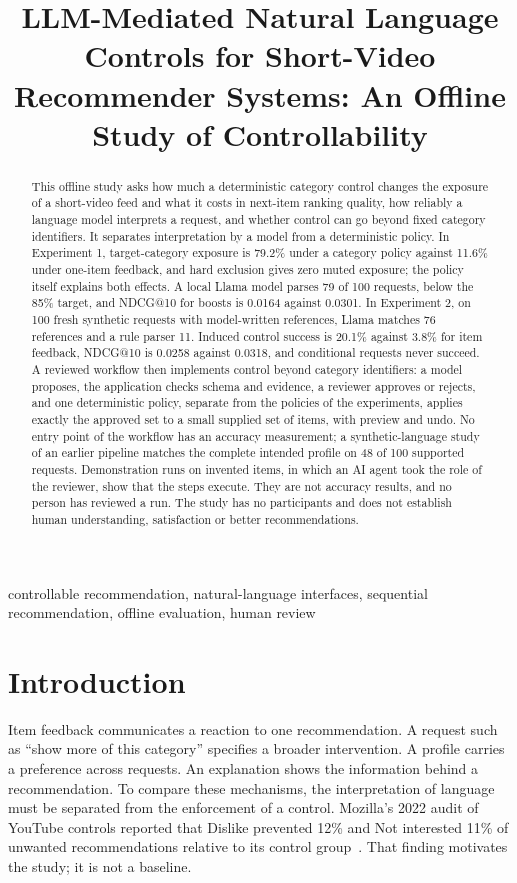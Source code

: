 \documentclass[conference]{IEEEtran}
\title{LLM-Mediated Natural Language Controls for Short-Video Recommender Systems: An Offline Study of Controllability}
\author{\IEEEauthorblockN{Vibhor Malik}\IEEEauthorblockA{M.Sc. in Applied Computing, British Columbia Institute of Technology\\COMP 9500 Research Project. Supervisor: Borna Noureddin. \PaperDate}}
\begin{document}
\maketitle
\thispagestyle{plain}\pagestyle{plain}
\begin{abstract}
This offline study asks how much a deterministic category control changes the exposure of a short-video feed and what it costs in next-item ranking quality, how reliably a language model interprets a request, and whether control can go beyond fixed category identifiers. It separates interpretation by a model from a deterministic policy. In Experiment 1, target-category exposure is 79.2\% under a category policy against 11.6\% under one-item feedback, and hard exclusion gives zero muted exposure; the policy itself explains both effects. A local Llama model parses 79 of 100 requests, below the 85\% target, and NDCG@10 for boosts is 0.0164 against 0.0301. In Experiment 2, on 100 fresh synthetic requests with model-written references, Llama matches 76 references and a rule parser 11. Induced control success is 20.1\% against 3.8\% for item feedback, NDCG@10 is 0.0258 against 0.0318, and conditional requests never succeed. A reviewed workflow then implements control beyond category identifiers: a model proposes, the application checks schema and evidence, a reviewer approves or rejects, and one deterministic policy, separate from the policies of the experiments, applies exactly the approved set to a small supplied set of items, with preview and undo. No entry point of the workflow has an accuracy measurement; a synthetic-language study of an earlier pipeline matches the complete intended profile on 48 of 100 supported requests. Demonstration runs on invented items, in which an AI agent took the role of the reviewer, show that the steps execute. They are not accuracy results, and no person has reviewed a run. The study has no participants and does not establish human understanding, satisfaction or better recommendations.
\end{abstract}
\begin{IEEEkeywords}
controllable recommendation, natural-language interfaces, sequential recommendation, offline evaluation, human review
\end{IEEEkeywords}

\section{Introduction}
Item feedback communicates a reaction to one recommendation. A request such as ``show more of this category'' specifies a broader intervention. A profile carries a preference across requests. An explanation shows the information behind a recommendation. To compare these mechanisms, the interpretation of language must be separated from the enforcement of a control. Mozilla's 2022 audit of YouTube controls reported that Dislike prevented 12\% and Not interested 11\% of unwanted recommendations relative to its control group~\cite{ricks2022button}. That finding motivates the study; it is not a baseline.
\end{document}
